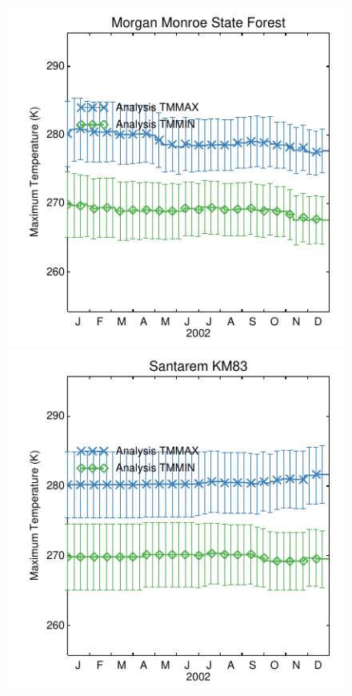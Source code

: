 \documentclass[a4paper,12pt]{article}
\begin{document}
\begin{figure}[hp]
\begin{center}
\includegraphics[scale=0.5]{Morgan_Monroe_State_Forest.dayplot.2002.TMMAX.MODIS.pdf}
\includegraphics[scale=0.5]{Santarem_KM83.dayplot.2002.TMMAX.MODIS.pdf}

\end{center}
\end{figure}
\end{document}
